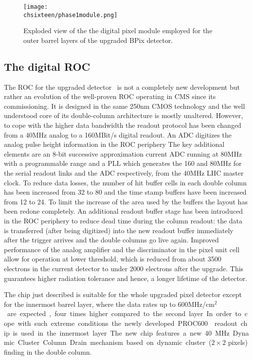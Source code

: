 \begin{figure}[!htb]
 \begin{center}
 \texttt{[image: \\chsixteen/phase1module.png]}
 \end{center}
 \caption{Exploded view of the the digital pixel module employed for the outer barrel layers of the upgraded BPix detector.}
 \label{fig:Phase1Mod}
\end{figure}

\subsection{The digital ROC}

The ROC for the upgraded detector~\cite{Kastli201388} is not a completely new development but rather an evolution of the well-proven ROC operating in CMS since its commissioning.
It is designed in the same 250\unit{nm} CMOS technology and the well understood core of its double-column architecture is mostly unaltered.
However, to cope with the higher data bandwidth the readout protocol has been changed from a 40\unit{MHz} analog to a 160\unit{MBit/s} digital readout. An ADC digitizes the analog pulse height information in the ROC periphery
The key additional elements are an 8-bit successive approximation current ADC running at 80\unit{MHz} with a programmable range and a PLL which generates the 160 and 80\unit{MHz} for the serial readout links and the ADC respectively, from the 40\unit{MHz} LHC master clock.
To reduce data losses, the number of hit buffer cells in each double column has been increased from 32 to 80 and the time stamp buffers have been increased from 12 to 24.
To limit the increase of the area used by the buffers the layout has been redone completely.
An additional readout buffer stage has been introduced in the ROC periphery to reduce dead time during the column readout: the data is transferred (after being digitized) into the new readout buffer immediately after the trigger arrives and the double columns go live again.
Improved performance of the analog amplifier and the discriminator in the pixel unit cell allow for operation at lower threshold, which is reduced from about 3500 electrons in the current detector to under 2000 electrons after the upgrade. This guarantees higher radiation tolerance and hence, a longer lifetime of the detector.

The chip just described is suitable for the whole upgraded pixel detector except for the innermost barrel layer, where the data rates up to 600\unit{MHz/cm$^2$} are expected, four times higher compared to the second layer.
In order to cope with such extreme conditions the newly developed PROC600~\cite{Starodumov:2227967} readout chip is used in the innermost layer. The new chip features a new 40\unit{MHz} Dynamic Cluster Column Drain mechanism based on dynamic cluster ($2\times2$ pixels) finding in the double column.

